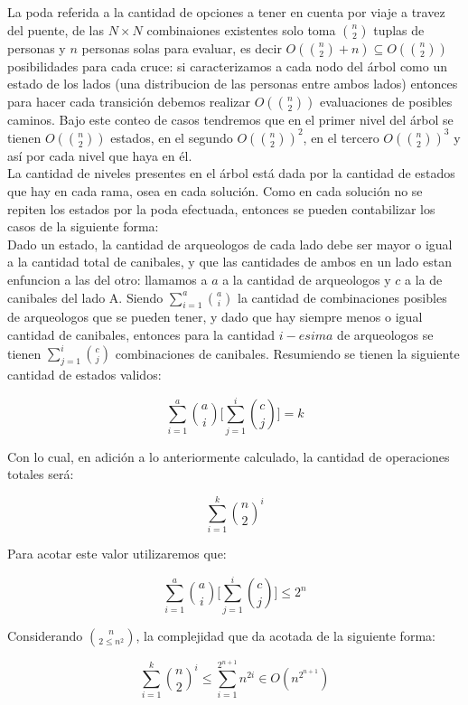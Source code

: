 La poda referida a la cantidad de opciones a tener en cuenta por viaje a travez del puente, de las $N \times N$ combinaiones existentes solo toma $\binom {n}{2}$ tuplas de personas y $n$ personas solas para evaluar, es decir $O(\binom {n}{2} + n) \subseteq O(\binom {n}{2})$ posibilidades para cada cruce: si caracterizamos a cada nodo del árbol como un estado de los lados (una distribucion de las personas entre ambos lados) entonces para hacer cada transición debemos realizar $O(\binom {n}{2})$ evaluaciones de posibles caminos. Bajo este conteo de casos tendremos que en el primer nivel del árbol se tienen $O(\binom {n}{2})$ estados, en el segundo $O(\binom {n}{2})^2$, en el tercero $O(\binom {n}{2})^3$ y así por cada nivel que haya en él.\\

La cantidad de niveles presentes en el árbol está dada por la cantidad de estados que hay en cada rama, osea en cada solución. Como en cada solución no se repiten los estados por la poda efectuada, entonces se pueden contabilizar los casos de la siguiente forma:\\

Dado un estado, la cantidad de arqueologos de cada lado debe ser mayor o igual a la cantidad total de canibales, y que las cantidades de ambos en un lado estan enfuncion a las del otro: llamamos a  $a$ a la cantidad de arqueologos y $c$ a la de canibales del lado A. Siendo $\sum_{i=1}^{a}\binom {a}{i}$ la cantidad de combinaciones posibles de arqueologos que se pueden tener, y dado que hay siempre menos o igual cantidad de canibales, entonces para la cantidad  $i-esima$ de arqueologos se tienen $\sum_{j=1}^{i}\binom {c}{j}$ combinaciones de canibales. Resumiendo se tienen la siguiente cantidad de estados validos:

\[
\sum_{i=1}^{a}\binom{a}{i}\bigg[\sum_{j=1}^{i}\binom{c}{j}\bigg]=k
\]  

Con lo cual, en adición a lo anteriormente calculado, la cantidad de operaciones totales será:

 \[
 \sum_{i=1}^{k}\binom{n}{2}^i
 \]

Para acotar este valor utilizaremos que:

\[
\sum_{i=1}^{a}\binom{a}{i}\bigg[\sum_{j=1}^{i}\binom{c}{j}\bigg]\leq 2^{n}
\]

Considerando $\binom{n}{2 \leq n^2}$, la complejidad que da acotada de la siguiente forma:

 \[
 \sum_{i=1}^{k}\binom{n}{2}^i \leq \sum_{i=1}^{2^{n+1}}n^{2i} \in O(n^{2^{n+1}})
 \]



\newpage


